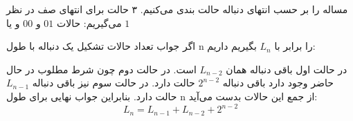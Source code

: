 \p
    مساله را بر حسب انتهای دنباله حالت بندی می‌کنیم.
    ۳ حالت برای انتهای صف در نظر می‌گیریم:
    حالات
    $01$
    و 
    $00$
    و یا
    $1$
    
    اگر جواب تعداد حالات تشکیل یک دنباله با طول n را برابر با \(L_n\) بگیریم داریم: 
    

    در حالت اول باقی دنباله همان \(L_{n-2}\) است. در حالت دوم چون شرط مطلوب در حال حاضر وجود دارد باقی دنباله \(2^{n-2}\) حالت دارد. در حالت سوم نیز باقی دنباله \(L_{n-1}\) حالت دارد. بنابراین جواب نهایی برای طول n از جمع این حالات بدست می‌آید:
    \[L_n = L_{n-1} + L_{n-2} + 2^{n-2} \]



